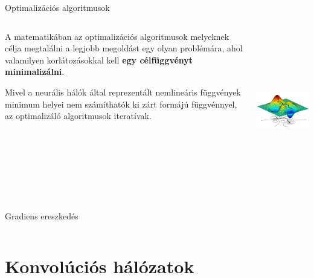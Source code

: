 \documentclass[english, aspectratio=169]{beamer}
\begin{document}
\begin{frame}{Optimalizációs algoritmusok}
\begin{columns}
\begin{column}{.5\textwidth}
A matematikában az optimalizációs algoritmusok melyeknek célja megtalálni a legjobb megoldást egy olyan problémára, ahol valamilyen korlátozásokkal kell \textbf{egy célfüggvényt minimalizálni}.\par\smallskip
Mivel a neurális hálók által reprezentált nemlineáris függvények minimum helyei nem számíthatók ki zárt formájú függvénnyel, az optimalizáló algoritmusok iteratívak. 
\end{column}
\begin{column}{.5\textwidth}
\begin{center}
\includegraphics[height=7cm, width=7cm, keepaspectratio]{images/dl_8.png}
\end{center}
\end{column}
\end{columns}
\end{frame}

\begin{frame}{Gradiens ereszkedés}
\begin{columns}
\begin{column}{.5\textwidth}
\end{column}
\begin{column}{.5\textwidth}

\end{column}
\end{columns}
\end{frame}

\section{Konvolúciós hálózatok}
\end{document}
